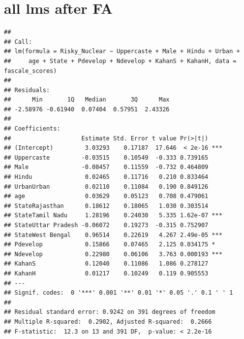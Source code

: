 \documentclass[
]{article}
\begin{document}
\hypertarget{all-lms-after-fa}{%
\section{all lms after FA}\label{all-lms-after-fa}}

\begin{verbatim}
## 
## Call:
## lm(formula = Risky_Nuclear ~ Uppercaste + Male + Hindu + Urban + 
##     age + State + Pdevelop + Ndevelop + KahanS + KahanH, data = fascale_scores)
## 
## Residuals:
##      Min       1Q   Median       3Q      Max 
## -2.58976 -0.61940  0.07404  0.57951  2.43326 
## 
## Coefficients:
##                    Estimate Std. Error t value Pr(>|t|)    
## (Intercept)         3.03293    0.17187  17.646  < 2e-16 ***
## Uppercaste         -0.03515    0.10549  -0.333 0.739165    
## Male               -0.08457    0.11559  -0.732 0.464809    
## Hindu               0.02465    0.11716   0.210 0.833464    
## UrbanUrban          0.02110    0.11084   0.190 0.849126    
## age                 0.03629    0.05123   0.708 0.479061    
## StateRajasthan      0.18612    0.18065   1.030 0.303514    
## StateTamil Nadu     1.28196    0.24030   5.335 1.62e-07 ***
## StateUttar Pradesh -0.06072    0.19273  -0.315 0.752907    
## StateWest Bengal    0.96514    0.22619   4.267 2.49e-05 ***
## Pdevelop            0.15866    0.07465   2.125 0.034175 *  
## Ndevelop            0.22980    0.06106   3.763 0.000193 ***
## KahanS              0.12040    0.11086   1.086 0.278127    
## KahanH              0.01217    0.10249   0.119 0.905553    
## ---
## Signif. codes:  0 '***' 0.001 '**' 0.01 '*' 0.05 '.' 0.1 ' ' 1
## 
## Residual standard error: 0.9242 on 391 degrees of freedom
## Multiple R-squared:  0.2902, Adjusted R-squared:  0.2666 
## F-statistic:  12.3 on 13 and 391 DF,  p-value: < 2.2e-16
\end{verbatim}
\end{document}
